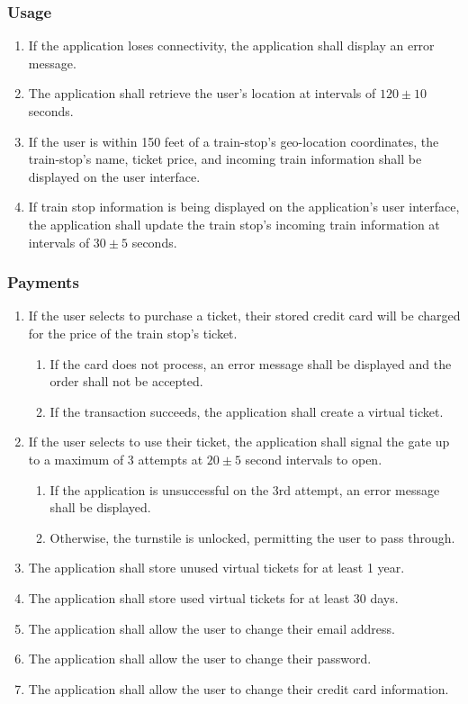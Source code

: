 	\subsubsection{Usage}\begin{enumerate}
		\item If the application loses connectivity, the application shall display an error message. 
		\item The application shall retrieve the user’s location at intervals of $120\pm10$ seconds.
		\item If the user is within 150 feet of a train-stop’s geo-location coordinates, the train-stop’s name, ticket price, and incoming train information shall be displayed on the user interface.
		\item If train stop information is being displayed on the application’s user interface, the application shall update the train stop’s incoming train information at intervals of $30\pm 5$ seconds.
	\end{enumerate}
	
	\subsubsection{Payments}\begin{enumerate}
		\item If the user selects to purchase a ticket, their stored credit card will be charged for the price of the train stop’s ticket.
		\begin{enumerate}
			\item If the card does not process, an error message shall be displayed and the order shall not be accepted.
			\item If the transaction succeeds, the application shall create a virtual ticket.
		\end{enumerate}
		\item If the user selects to use their ticket, the application shall signal the gate up to a maximum of 3 attempts at $20\pm 5$ second intervals to open.
			\begin{enumerate}
				\item If the application is unsuccessful on the 3rd attempt, an error message shall be displayed.
				\item Otherwise, the turnstile is unlocked, permitting the user to pass through.
			\end{enumerate}
		\item The application shall store unused virtual tickets for at least 1 year.
		\item The application shall store used virtual tickets for at least 30 days.
		\item The application shall allow the user to change their email address.
		\item The application shall allow the user to change their password.
		\item The application shall allow the user to change their credit card information.
	\end{enumerate}		
\newpage	
